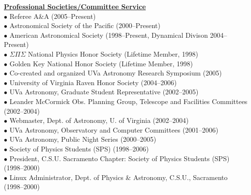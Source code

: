 \documentclass[12pt]{article}
\begin{document}

\noindent \underline{\bf Professional Societies/Committee Service }\\
\noindent $\bullet$ Referee A\&A (2005--Present) \\
$\bullet$     Astronomical Society of the Pacific (2000--Present) \\
$\bullet$     American Astronomical Society (1998--Present, Dynamical Divison 2004--Present) \\
$\bullet$     $\Sigma \Pi \Sigma$ National Physics Honor Society (Lifetime Member, 1998) \\
$\bullet$     Golden Key National Honor Society (Lifetime Member, 1998) \\
$\bullet$ Co-created and organized UVa Astronomy Research Symposium (2005) \\
$\bullet$ University of Virginia Raven Honor Society (2004--2006) \\
$\bullet$     UVa Astronomy, Graduate Student Representative (2002--2005) \\
$\bullet$ Leander McCormick Obs. Planning Group, Telescope and Facilities Committees (2002--2004)  \\
$\bullet$     Webmaster, Dept. of Astronomy, U. of Virginia (2002--2004) \\
$\bullet$     UVa Astronomy, Observatory and Computer Committees (2001--2006) \\
$\bullet$     UVa Astronomy, Public Night Series (2000--2005) \\
$\bullet$     Society of Physics Students (SPS) (1998--2006) \\
$\bullet$     President, C.S.U. Sacramento Chapter: Society of Physics Students (SPS) (1998--2000) \\
$\bullet$ Linux Administrator, Dept. of Physics \& Astronomy, C.S.U., Sacramento (1998--2000) 

\end{document}
